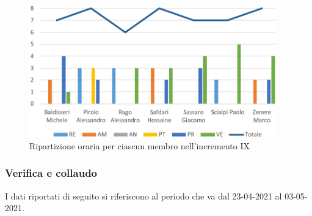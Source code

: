 \begin{figure}[!htb]   
    \centering
    \includegraphics[width=0.95\textwidth]{Images/prev9}
	\caption{Ripartizione oraria per ciascun membro nell'incremento IX}
\end{figure}

\subsubsection{Verifica e collaudo}

I dati riportati di seguito si riferiscono al periodo che va dal 23-04-2021 al 03-05-2021.

